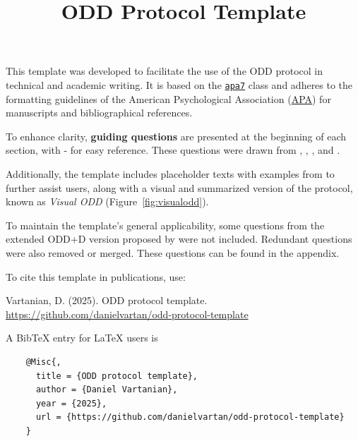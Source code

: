 \documentclass[
  man,
  10pt,
  a4paper,
  floatsintext
]{apa7}
\title{ODD Protocol Template}
\author{\addORCIDlink{Your Name Here}{0000-0000-0000-0000}}
\affiliation{Your Affiliation Here}
\begin{document}

\maketitle


This template was developed to facilitate the use of the ODD protocol \autocite{grimm2006a, grimm2020} in technical and academic writing. It is based on the \href{https://ctan.org/pkg/apa7}{\texttt{apa7}} class and adheres to the formatting guidelines of the American Psychological Association (\href{https://apastyle.apa.org/}{APA}) for manuscripts and bibliographical references.

To enhance clarity, \textbf{guiding questions} are presented at the beginning of each section, with - for easy reference. These questions were drawn from \autocite{grimm2010}, \autocite{grimm2020}, \autocite{muller2013}, and \autocite{railsback2019a}.

Additionally, the template includes placeholder texts with examples from \autocite{grimm2020} to further assist users, along with a visual and summarized version of the protocol, known as \textit{Visual ODD} \autocite{szangolies2024} (Figure~\ref{fig:visualodd}).

To maintain the template's general applicability, some questions from the extended ODD+D version proposed by \autocite{muller2013} were not included. Redundant questions were also removed or merged. These questions can be found in the appendix.

\begin{citationbox}
  \raggedright
  To cite this template in publications, use:

  \tinyskip

  Vartanian, D. (2025). ODD protocol template. \url{https://github.com/danielvartan/odd-protocol-template}

  \tinyskip

  A BibTeX entry for LaTeX users is

  \begin{verbatim}
    @Misc{,
      title = {ODD protocol template},
      author = {Daniel Vartanian},
      year = {2025},
      url = {https://github.com/danielvartan/odd-protocol-template}
    }
  \end{verbatim}
  \vspace{-1\baselineskip}
\end{citationbox}
\end{document}
